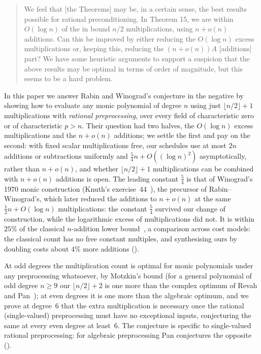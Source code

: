 \begin{quote}
   We feel that [the Theorems] may be, in a certain sense, the best results possible for rational preconditioning.
   In Theorem 15, we are within $O(\log n)$ of the in bound $n/2$ multiplications, using $n + o(n)$ additions.
   Can this be improved by either reducing the $O(\log n)$ excess multiplications or, keeping this, reducing the $(n + o(n))A$ [additions] part?
   We have some heuristic arguments to support a suspicion that the above results may be optimal in terms of order of magnitude, but this seems to be a hard problem.
\end{quote}

In this paper we answer Rabin and Winograd's conjecture in the negative by showing how to evaluate any monic polynomial of degree $n$ using just $\lfloor n/2\rfloor+1$ multiplications with \emph{rational preprocessing}, over every field of characteristic zero or of characteristic $p>n$.  Their question had two halves, the $O(\log n)$ excess multiplications and the $n+o(n)$ additions; we settle the first and pay on the second: with fixed scalar multiplications free, our schedules use at most $2n$ additions or subtractions uniformly and $\frac54n+O((\log n)^2)$ asymptotically, rather than $n+o(n)$, and whether $\lfloor n/2\rfloor+1$ multiplications can be combined with $n+o(n)$ additions is open.  The leading constant $\frac54$ is that of Winograd's 1970 monic construction (Knuth's exercise~44~\cite[\S4.6.4]{knuth1997seminumerical}), the precursor of Rabin--Winograd's, which later reduced the additions to $n+o(n)$ at the same $\frac12n+O(\log n)$ multiplications: the constant $\frac54$ survived our change of construction, while the logarithmic excess of multiplications did not.  It is within $25\%$ of the classical $n$-addition lower bound~\cite{belaga1958some,belaga1961evaluation}, a comparison across cost models: the classical count has no free constant multiples, and synthesising ours by doubling costs about $4\%$ more additions ().

At odd degrees the multiplication count is optimal for monic polynomials under any preprocessing whatsoever, by Motzkin's bound (for a general polynomial of odd degree $n\ge9$ our $\lfloor n/2\rfloor+2$ is one more than the complex optimum of Revah and Pan~\cite{revah1975number,pan1978complex}); at even degrees it is one more than the algebraic optimum, and we prove at degree~$6$ that the extra multiplication is necessary once the rational (single-valued) preprocessing must have no exceptional inputs, conjecturing the same at every even degree at least~$6$.  The conjecture is specific to single-valued rational preprocessing: for algebraic preprocessing Pan conjectures the opposite~\cite{pan1978complex} ().

